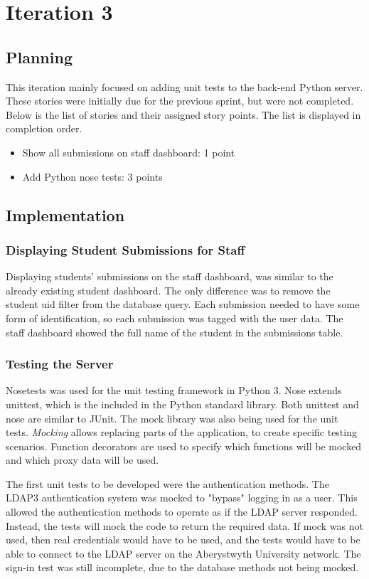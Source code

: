 \chapter{Iteration 3}
\section{Planning}
This iteration mainly focused on adding unit tests to the back-end Python server. These stories were initially due for the previous sprint, but were not completed. Below is the list of stories and their assigned story points. The list is displayed in completion order.

\begin{itemize}
\item Show all submissions on staff dashboard: 1 point
\item Add Python nose tests: 3 points
\end{itemize}

\section{Implementation}
\subsection{Displaying Student Submissions for Staff}
Displaying students' submissions on the staff dashboard, was similar to the already existing student dashboard. The only difference was to remove the student uid filter from the database query. Each submission needed to have some form of identification, so each submission was tagged with the user data. The staff dashboard showed the full name of the student in the submissions table.

\subsection{Testing the Server}
Nosetests was used for the unit testing framework in Python 3. Nose extends unittest, which is the included in the Python standard library. Both unittest and nose are similar to JUnit. The mock library was also being used for the unit tests. \textit{Mocking} allows replacing parts of the application, to create specific testing scenarios. Function decorators are used to specify which functions will be mocked and which proxy data will be used.

The first unit tests to be developed were the authentication methods. The LDAP3 authentication system was mocked to "bypass" logging in as a user. This allowed the authentication methods to operate as if the LDAP server responded. Instead, the tests will mock the code to return the required data. If mock was not used, then real credentials would have to be used, and the tests would have to be able to connect to the LDAP server on the Aberystwyth University network. The sign-in test was still incomplete, due to the database methods not being mocked.


